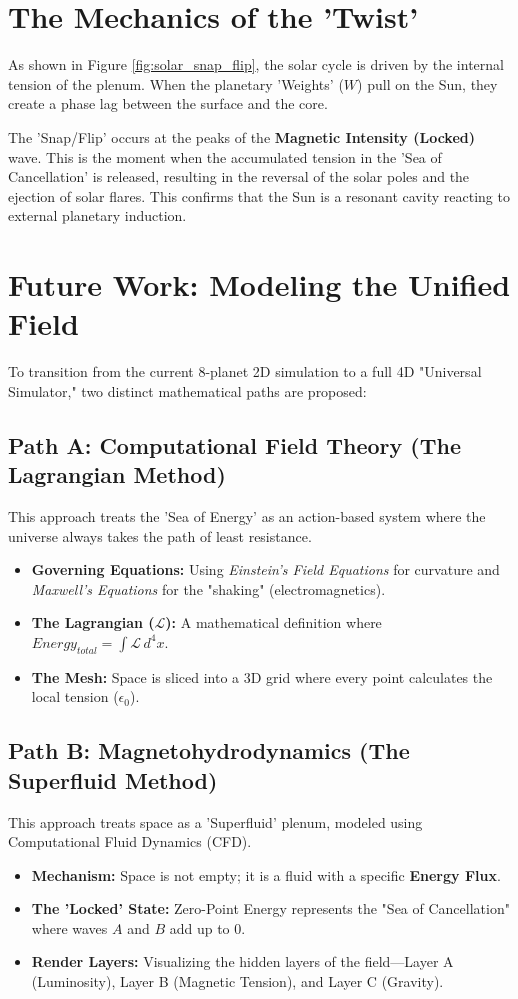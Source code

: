 \documentclass[11pt]{article}
\begin{document}
\section*{The Mechanics of the 'Twist'}
As shown in Figure \ref{fig:solar_snap_flip}, the solar cycle is driven by the internal tension of the plenum. When the planetary 'Weights' ($W$) pull on the Sun, they create a phase lag between the surface and the core. 


The 'Snap/Flip' occurs at the peaks of the \textbf{Magnetic Intensity (Locked)} wave. This is the moment when the accumulated tension in the 'Sea of Cancellation' is released, resulting in the reversal of the solar poles and the ejection of solar flares. This confirms that the Sun is a resonant cavity reacting to external planetary induction.

\section*{Future Work: Modeling the Unified Field}
To transition from the current 8-planet 2D simulation to a full 4D "Universal Simulator," two distinct mathematical paths are proposed:

\subsection*{Path A: Computational Field Theory (The Lagrangian Method)}
This approach treats the 'Sea of Energy' as an action-based system where the universe always takes the path of least resistance.
\begin{itemize}
    \item \textbf{Governing Equations:} Using \textit{Einstein's Field Equations} for curvature and \textit{Maxwell's Equations} for the "shaking" (electromagnetics).
    \item \textbf{The Lagrangian ($\mathcal{L}$):} A mathematical definition where $Energy_{total} = \int \mathcal{L} \, d^4x$.
    \item \textbf{The Mesh:} Space is sliced into a 3D grid where every point calculates the local tension ($\epsilon_0$).
\end{itemize}



\subsection*{Path B: Magnetohydrodynamics (The Superfluid Method)}
This approach treats space as a 'Superfluid' plenum, modeled using Computational Fluid Dynamics (CFD).
\begin{itemize}
    \item \textbf{Mechanism:} Space is not empty; it is a fluid with a specific \textbf{Energy Flux}.
    \item \textbf{The 'Locked' State:} Zero-Point Energy represents the "Sea of Cancellation" where waves $A$ and $B$ add up to $0$.
    \item \textbf{Render Layers:} Visualizing the hidden layers of the field—Layer A (Luminosity), Layer B (Magnetic Tension), and Layer C (Gravity).
\end{itemize}
\end{document}
